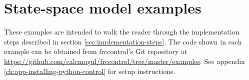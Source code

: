 
\chapter{State-space model examples}

These examples are intended to walk the reader through the implementation steps
described in section \ref{sec:implementation-steps}. The code shown in each
example can be obtained from frccontrol's Git repository at
\url{https://github.com/calcmogul/frccontrol/tree/master/examples}.
See appendix \ref{ch:app-installing-python-control} for setup instructions.







